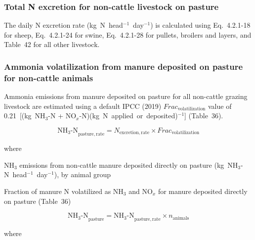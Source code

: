 \subsubsection{Total N excretion for non-cattle livestock on pasture}
\label{subsubsec:grazing-n-excretion-noncattle}

The daily N excretion rate (kg~N~head$^{-1}$~day$^{-1}$) is calculated using
Eq.~4.2.1-18 for sheep, Eq.~4.2.1-24 for swine, Eq.~4.2.1-28 for pullets,
broilers and layers, and Table~42 for all other livestock.

\subsubsection{Ammonia volatilization from manure deposited on pasture for non-cattle animals}
\label{subsubsec:grazing-nh3-noncattle-eq}

Ammonia emissions from manure deposited on pasture for all non-cattle grazing
livestock are estimated using a default IPCC (2019) $\mathit{Frac}_{\mathrm{volatilization}}$
value of 0.21~[(kg~NH$_3$-N + NO$_x$-N)(kg~N~applied~or~deposited)$^{-1}$]
(Table~36).

\begin{equation}
    \mathrm{NH_3\text{-}N}_{\mathrm{pasture,rate}}
        = N_{\mathrm{excretion,rate}}
          \times \mathit{Frac}_{\mathrm{volatilization}}
    \tag{Eq.\ 5.4.2-1}
\end{equation}

\noindent where

\begin{description}[font=\normalfont, leftmargin=12em, style=nextline, nosep]
    \item[$\mathrm{NH_3\text{-}N}_{\mathrm{pasture,rate}}$]
        NH$_3$ emissions from non-cattle manure deposited directly on pasture
        (kg~NH$_3$-N~head$^{-1}$~day$^{-1}$), by animal group
    \item[$\mathit{Frac}_{\mathrm{volatilization}}$]
        Fraction of manure N volatilized as NH$_3$ and NO$_x$ for manure
        deposited directly on pasture (Table~36)
\end{description}

\begin{equation}
    \mathrm{NH_3\text{-}N}_{\mathrm{pasture}}
        = \mathrm{NH_3\text{-}N}_{\mathrm{pasture,rate}}
          \times n_{\mathrm{animals}}
    \tag{Eq.\ 5.4.2-2}
\end{equation}

\noindent where

